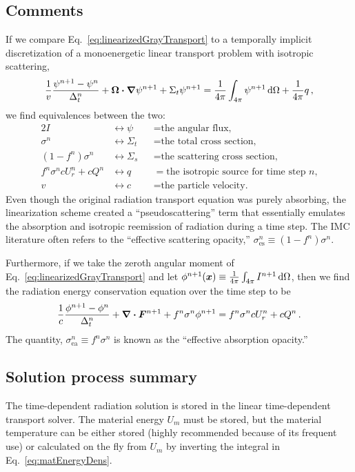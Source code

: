 \subsection{Comments}\label{sec:trtLinearizedComments}
If we compare Eq.~\eqref{eq:linearizedGrayTransport} to a temporally implicit
discretization of a monoenergetic linear transport problem with isotropic
scattering,
\begin{equation*}
  \frac{1}{v} \frac{\psi^{n+1} - \psi^n}{\Delta_t^n} 
  + \bm{\Omega} \bm{\cdot} \bm{\nabla} \psi^{n+1}
 + \Sigma_t \psi^{n+1}
 = \frac{1}{4\pi} \int_{4\pi} \psi^{n+1}\mathop{}\!\mathrm{d} \Omega
  + \frac{1}{4\pi} q \,,
\end{equation*}
we find equivalences between the two:
\begin{alignat*}{2}
  I &\leftrightarrow \psi &&= \text{the angular flux,}
  \\
  \sigma^n &\leftrightarrow \Sigma_t &&= \text{the total cross section,}
  \\
  \left(1 - f^n\right) \sigma^n &\leftrightarrow \Sigma_s &&= \text{the scattering cross
  section,} 
  \\
  f^n \sigma^n c U_r^n + c Q^n &\leftrightarrow q &&= \text{the isotropic source for time
  step $n$,}
  \\
  v   &\leftrightarrow c &&= \text{the particle velocity.}
\end{alignat*}
Even though the original radiation transport equation was purely
absorbing, the linearization scheme created a ``pseudoscattering''
term that essentially emulates the absorption and isotropic reemission of
radiation during a time step. The IMC literature often refers to the
``effective scattering opacity,''
$\sigma_\text{es}^n \equiv \left(1 - f^n\right) \sigma^n$.

Furthermore, if we take the zeroth angular moment of
Eq.~\eqref{eq:linearizedGrayTransport} and let $\phi^{n+1}(\bm{x}) \equiv
\frac{1}{4\pi} \int_{4\pi} I^{n+1}\mathop{}\!\mathrm{d} \Omega$, then we find the radiation
energy conservation equation over the time step to be
\begin{equation}\label{eq:semiImplicitZeroth}
  \frac{1}{c} \frac{\phi^{n+1} - \phi^n}{\Delta_t^n}
  + \bm{\nabla} \bm{\cdot} \bm{F}^{n+1} + f^n\sigma^n \phi^{n+1}
 =  f^n \sigma^n c U_r^n + c Q^n\,.
\end{equation}
The quantity, $\sigma_\text{ea}^n \equiv f^n\sigma^n$ is known as the
``effective absorption opacity.''

\subsection{Solution process summary}
The time-dependent radiation solution is stored in the linear time-dependent
transport solver. The material energy $U_m$ must be stored, but the
material temperature can be either stored (highly recommended because of its
frequent use) or calculated on the fly from $U_m$ by inverting the integral in
Eq.~\eqref{eq:matEnergyDens}.

